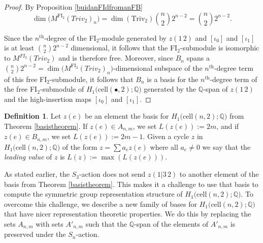 \documentclass[12py]{amsart}%
\theoremstyle{definition}\newtheorem{definition}[thm]{Definition}
\theoremstyle{definition}
\newtheorem{defn}[thm]{Definition}
\newcommand{\Q}{\ensuremath{\mathbb{Q}}}
\begin{document}
\begin{proof}
By Proposition \ref{buidanFIdfromanFB}
\[
\dim\big(M^{\text{FI}_{2}}(Triv_{2})_{n}\big)=\dim(\text{Triv}_{2})\binom{n}{2}2^{n-2}=\binom{n}{2}2^{n-2}.
\]

Since the $n^{\text{th}}$-degree of the FI$_{2}$-module generated by $z(1\,2)$ and $[\iota_{0}]$ and $[\iota_{1}]$ is at least $\binom{n}{2}2^{n-2}$ dimensional, it follows that the FI$_{2}$-submodule is isomorphic to $M^{FI_{2}}(Triv_{2})$ and is therefore free. Moreover, since $B_{n}$ spans a $\binom{n}{2}2^{n-2}=\dim\big(M^{\text{FI}_{2}}(Triv_{2})_{n}\big)$-dimensional subspace of the $n^{\text{th}}$-degree term of this free FI$_{2}$-submodule, it follows that $B_{n}$ is a basis for the $n^{\text{th}}$-degree term of the free FI$_{2}$-submodule of $H_{1}\big(\text{cell}(\bullet,2);\Q\big)$ generated by the $\Q$-span of $z(1\,2)$ and the high-insertion maps $[\iota_{0}]$ and $[\iota_{1}]$.
\end{proof}

\begin{defn}
Let $z(e)$ be an element the basis for $H_{1}\big(\text{cell}(n,2);\Q\big)$ from Theorem \ref{basistheorem}. If $z(e)\in A_{n,m}$, we set $L(z(e)):=2m$, and if $z(e)\in B_{n,m}$, we set $L(z(e)):=2m-1$. Given a cycle $z$ in $H_{1}\big(\text{cell}(n,2);\Q\big)$ of the form $z=\sum a_{e}z(e)$ where all $a_{e}\neq 0$ we say that the \emph{leading value} of $z$ is $L(z):=\max(L(z(e)))$.
\end{defn}

As stated earlier, the $S_{3}$-action does not send $z(1|3\,2)$ to another element of the basis from Theorem \ref{basistheorem}. This makes it a challenge to use that basis to compute the symmetric group representation structure of $H_{1}\big(\text{cell}(n,2);\Q\big)$. To overcome this challenge, we describe a new family of bases for $H_{1}\big(\text{cell}(n,2);\Q\big)$ that have nicer representation theoretic properties. We do this by replacing the sets $A_{n,m}$ with sets $A'_{n,m}$ such that the $\Q$-span of the elements of $A'_{n,m}$ is preserved under the $S_{n}$-action.
\end{document}
